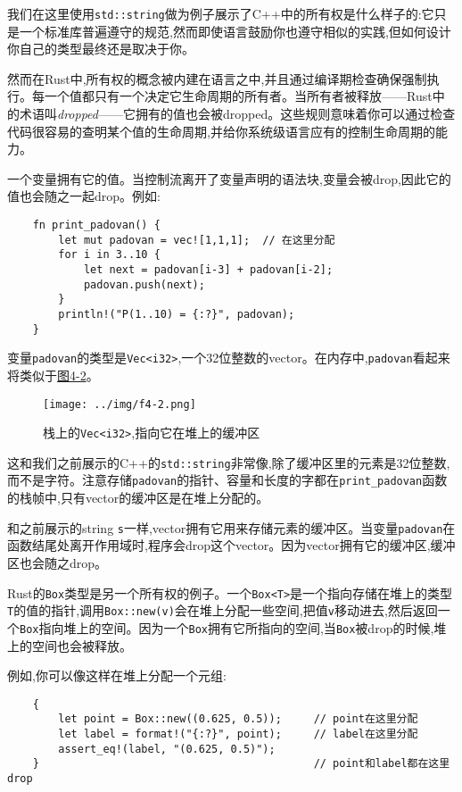 我们在这里使用\texttt{std::string}做为例子展示了C++中的所有权是什么样子的:它只是一个标准库普遍遵守的规范,然而即使语言鼓励你也遵守相似的实践,但如何设计你自己的类型最终还是取决于你。

然而在Rust中,所有权的概念被内建在语言之中,并且通过编译期检查确保强制执行。每一个值都只有一个决定它生命周期的所有者。当所有者被释放——Rust中的术语叫\emph{dropped}——它拥有的值也会被dropped。这些规则意味着你可以通过检查代码很容易的查明某个值的生命周期,并给你系统级语言应有的控制生命周期的能力。

一个变量拥有它的值。当控制流离开了变量声明的语法块,变量会被drop,因此它的值也会随之一起drop。例如:
\begin{verbatim}
    fn print_padovan() {
        let mut padovan = vec![1,1,1];  // 在这里分配
        for i in 3..10 {
            let next = padovan[i-3] + padovan[i-2];
            padovan.push(next);
        }
        println!("P(1..10) = {:?}", padovan);
    }
\end{verbatim}

变量\texttt{padovan}的类型是\texttt{Vec<i32>},一个32位整数的vector。在内存中,\texttt{padovan}看起来将类似于\hyperref[f4-2]{图4-2}。

\begin{figure}[htbp]
    \centering
    \texttt{[image: ../img/f4-2.png]}
    \caption{栈上的\texttt{Vec<i32>},指向它在堆上的缓冲区}
    \label{f4-2}
\end{figure}

这和我们之前展示的C++的\texttt{std::string}非常像,除了缓冲区里的元素是32位整数,而不是字符。注意存储\texttt{padovan}的指针、容量和长度的字都在\texttt{print\_padovan}函数的栈帧中,只有vector的缓冲区是在堆上分配的。

和之前展示的string \texttt{s}一样,vector拥有它用来存储元素的缓冲区。当变量\texttt{padovan}在函数结尾处离开作用域时,程序会drop这个vector。因为vector拥有它的缓冲区,缓冲区也会随之drop。

Rust的\texttt{Box}类型是另一个所有权的例子。一个\texttt{Box<T>}是一个指向存储在堆上的类型\texttt{T}的值的指针,调用\texttt{Box::new(v)}会在堆上分配一些空间,把值\texttt{v}移动进去,然后返回一个\texttt{Box}指向堆上的空间。因为一个\texttt{Box}拥有它所指向的空间,当\texttt{Box}被drop的时候,堆上的空间也会被释放。

例如,你可以像这样在堆上分配一个元组:
\begin{verbatim}
    {
        let point = Box::new((0.625, 0.5));     // point在这里分配
        let label = format!("{:?}", point);     // label在这里分配
        assert_eq!(label, "(0.625, 0.5)");
    }                                           // point和label都在这里drop
\end{verbatim}

